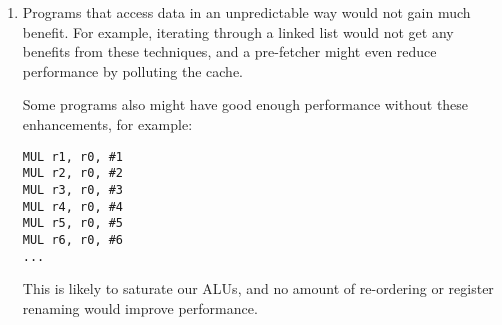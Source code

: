 \begin{enumerate}[label=(\alph*)]
\begin{enumerate}[label=(\roman*)]
\begin{itemize}
\end{itemize}

\item
    Programs that access data in an unpredictable way would not gain much benefit. For example, iterating through a linked list would not get any benefits from these techniques, and a pre-fetcher might even reduce performance by polluting the cache.

    Some programs also might have good enough performance without these enhancements, for example:

\begin{verbatim}
MUL r1, r0, #1
MUL r2, r0, #2
MUL r3, r0, #3
MUL r4, r0, #4
MUL r5, r0, #5
MUL r6, r0, #6
...
\end{verbatim}

This is likely to saturate our ALUs, and no amount of re-ordering or register renaming would improve performance.


            
        \end{enumerate}
        
    \end{enumerate}

